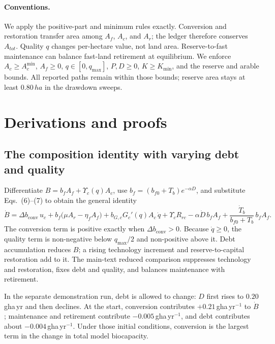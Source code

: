 \documentclass[11pt,a4paper]{article}
\newcommand{\dconv}{\Delta b_{\mathrm{conv}}}
\newcommand{\Ups}{\Upsilon_c}
\newcommand{\Acmin}{A_c^{\min}}
\begin{document}
\paragraph{Conventions.} We apply the positive-part and minimum rules exactly. Conversion and restoration transfer area among $A_f$, $A_c$, and $A_r$; the ledger therefore conserves $A_{tot}$. Quality $q$ changes per-hectare value, not land area. Reserve-to-fast maintenance can balance fast-land retirement at equilibrium. We enforce $A_c\ge\Acmin$, $A_f\ge0$, $q\in[0,q_{\max}]$, $P,D\ge0$, $K\ge K_{\min}$, and the reserve and arable bounds. All reported paths remain within those bounds; reserve area stays at least $0.80\,ha$ in the drawdown sweeps.

\section{Derivations and proofs}\label{si:proofs}

\subsection{The composition identity with varying debt and quality}\label{si:identity}

Differentiate $B=b_fA_f+\Ups(q)A_c$, use $b_f=(b_{f0}+T_b)e^{-\alpha D}$, and substitute Eqs.~(6)--(7) to obtain the general identity
\begin{equation}\label{eq:si_identity}
\dot B=\dconv\,u_c+b_f\big(\mu A_r-\eta_fA_f\big)+b_{G,c}G_c'(q)A_c\,\dot q+\Ups R_{rc}-\alpha\dot D\,b_fA_f+\frac{\dot T_b}{b_{f0}+T_b}\,b_fA_f .
\end{equation}
The conversion term is positive exactly when $\dconv>0$. Because $\dot q\ge0$, the quality term is non-negative below $q_{\max}/2$ and non-positive above it. Debt accumulation reduces $B$; a rising technology increment and reserve-to-capital restoration add to it. The main-text reduced comparison suppresses technology and restoration, fixes debt and quality, and balances maintenance with retirement.

In the separate demonstration run, debt is allowed to change: $D$ first rises to $0.20$\,gha\,yr and then declines. At the start, conversion contributes $+0.21$\,gha\,yr$^{-1}$ to $\dot B$; maintenance and retirement contribute $-0.005$\,gha\,yr$^{-1}$, and debt contributes about $-0.004$\,gha\,yr$^{-1}$. Under those initial conditions, conversion is the largest term in the change in total model biocapacity.
\end{document}
